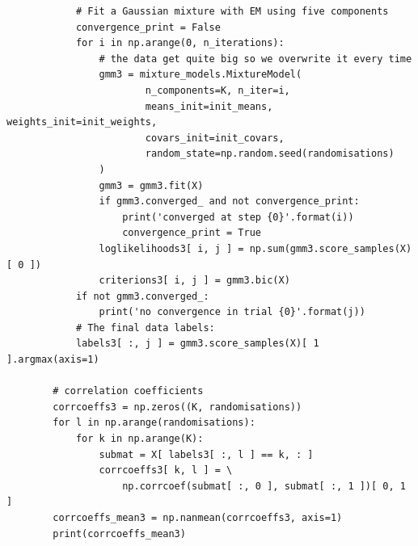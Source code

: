 \begin{verbatim}
            # Fit a Gaussian mixture with EM using five components
            convergence_print = False
            for i in np.arange(0, n_iterations):
                # the data get quite big so we overwrite it every time
                gmm3 = mixture_models.MixtureModel(
                        n_components=K, n_iter=i,
                        means_init=init_means, weights_init=init_weights,
                        covars_init=init_covars,
                        random_state=np.random.seed(randomisations)
                )
                gmm3 = gmm3.fit(X)
                if gmm3.converged_ and not convergence_print:
                    print('converged at step {0}'.format(i))
                    convergence_print = True
                loglikelihoods3[ i, j ] = np.sum(gmm3.score_samples(X)[ 0 ])
                criterions3[ i, j ] = gmm3.bic(X)
            if not gmm3.converged_:
                print('no convergence in trial {0}'.format(j))
            # The final data labels:
            labels3[ :, j ] = gmm3.score_samples(X)[ 1 ].argmax(axis=1)

        # correlation coefficients
        corrcoeffs3 = np.zeros((K, randomisations))
        for l in np.arange(randomisations):
            for k in np.arange(K):
                submat = X[ labels3[ :, l ] == k, : ]
                corrcoeffs3[ k, l ] = \
                    np.corrcoef(submat[ :, 0 ], submat[ :, 1 ])[ 0, 1 ]
        corrcoeffs_mean3 = np.nanmean(corrcoeffs3, axis=1)
        print(corrcoeffs_mean3)


\end{verbatim}
